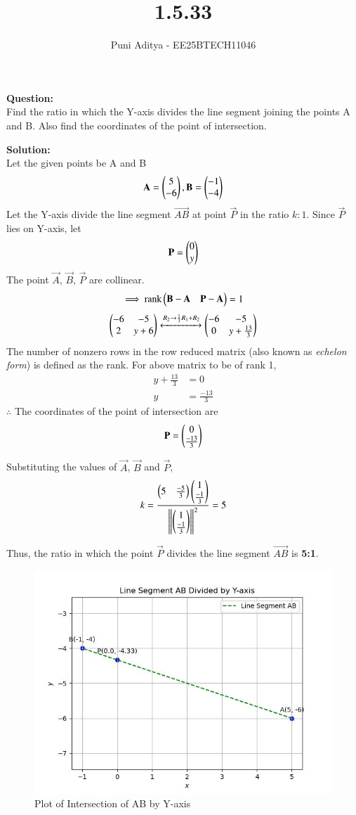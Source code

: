 \documentclass[journal]{IEEEtran}
\begin{document}
\title{1.5.33}
\author{Puni Aditya - EE25BTECH11046}
\maketitle

\textbf{Question:}\\
Find the ratio in which the Y-axis divides the line segment joining the points A and B. Also find the coordinates of the point of intersection.

\textbf{Solution:}\\
Let the given points be A and B
\begin{align*} \vec{A} = \myvec{5 \\ -6}, \vec{B} = \myvec{-1 \\ -4} \end{align*}
Let the Y-axis divide the line segment $\vec{AB}$ at point $\vec{P}$ in the ratio $k:1$.
Since $\vec{P}$ lies on Y-axis, let
\begin{align*}
\vec{P} = \myvec{0 \\ y}
\end{align*}
The point $\vec{A}$, $\vec{B}$, $\vec{P}$ are collinear.
\begin{align}
\implies \text{rank}\myvec{\vec{B}-\vec{A} & \vec{P}-\vec{A}} = 1
\end{align}
\begin{align}
\myvec{-6 & -5 \\ 2 & y+6} \xleftrightarrow[]{R_2 \rightarrow {\frac{1}{3}R_1 + R_2}}\myvec{-6 & -5 \\ 0 & y+\frac{13}{3}}  
\end{align}
The number of nonzero rows in the row reduced matrix (also known as {\em echelon form}) is defined as the rank. For above matrix to be of rank 1,
\begin{align}
y+\frac{13}{3} &= 0 \\
y &= \frac{-13}{3}
\end{align}
$\therefore$ The coordinates of the point of intersection are 
\begin{align*}
\vec{P} = \myvec{0 \\ \frac{-13}{3}}
\end{align*}

Substituting the values of $\vec{A}$, $\vec{B}$ and $\vec{P}$,
\begin{align}
k=\frac{\myvec{5 & \frac{-5}{3}}\myvec{1 \\ \frac{-1}{3}}}{\norm{\myvec{1 \\ \frac{-1}{3}}}^2}=5
\end{align}

Thus, the ratio in which the point $\vec{P}$ divides the line segment $\vec{AB}$ is \textbf{5:1}. \\

\begin{figure}
    \centering
    \includegraphics[width=0.5\columnwidth]{figs/plot_c.jpg}
    \caption*{Plot of Intersection of AB by Y-axis}
    \label{fig:fig}
\end{figure}
\end{document}
